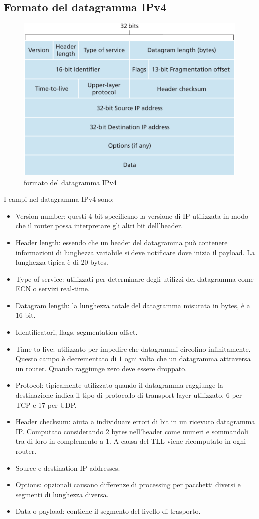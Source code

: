 \subsection{Formato del datagramma IPv4}
\begin{figure}[h]
\includegraphics[width=\textwidth]{Pictures/IPv4Datagram.png}
\caption{formato del datagramma IPv4}
\end{figure}
I campi nel datagramma IPv4 sono:
\begin{itemize}
\item Version number: questi 4 bit specificano la versione di IP utilizzata in modo che il router possa interpretare gli altri bit dell'header.
\item Header length: essendo che un header del datagramma pu\`o contenere informazioni di lunghezza variabile si deve notificare dove inizia il payload.
La lunghezza tipica \`e di 20 bytes.
\item Type of service: utilizzati per determinare degli utilizzi del datagramma come ECN o servizi real-time.
\item Datagram length: la lunghezza totale del datagramma misurata in bytes, \`e a 16 bit.
\item Identificatori, flags, segmentation offset.
\item Time-to-live: utilizzato per impedire che datagrammi circolino infinitamente. Questo campo \`e decrementato di $1$ ogni volta che un datagramma 
attraversa un router. Quando raggiunge zero deve essere droppato.
\item Protocol: tipicamente utilizzato quando il datagramma raggiunge la destinazione indica il tipo di protocollo di transport layer utilizzato. 6 per TCP
e 17 per UDP.
\item Header checksum: aiuta a individuare errori di bit in un ricevuto datagramma IP. Computato considerando 2 bytes nell'header come numeri e sommandoli 
tra di loro in complemento a 1. A causa del TLL viene ricomputato in ogni router. 
\item Source e destination IP addresses.
\item Options: opzionali causano differenze di processing per pacchetti diversi e segmenti di lunghezza diversa.
\item Data o payload: contiene il segmento del livello di trasporto. 
\end{itemize}

